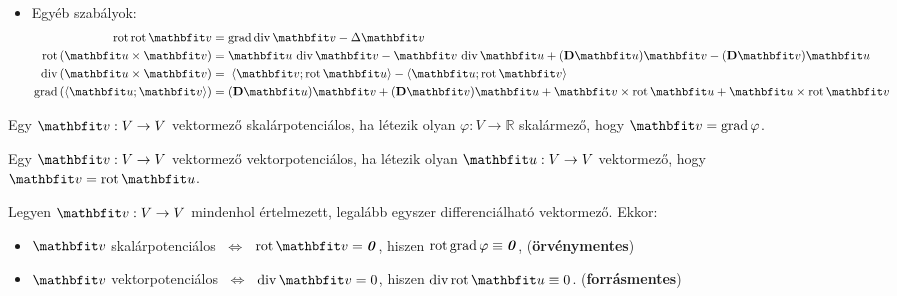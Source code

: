 \documentclass{szb-practice}
\begin{document}
\begin{blueBox}[][nobreak]
\begin{itemize}
    \item Egyéb szabályok:
          \vspace{-.5em}
          \begin{align*}
            \rot \rot \rvec v
             & =\grad \Div \rvec v
            - \Delta \rvec v
            \\
            \rot \left( \rvec u \times \rvec v \right)
             & = \rvec u \, \Div \rvec v
            - \rvec v \, \Div \rvec u
            + (\DD \rvec u) \rvec v
            - (\DD \rvec v) \rvec u
            \\
            \Div \left( \rvec u \times \rvec v \right)
             & = \; \scalar{\rvec v}{\rot \rvec u}
            - \scalar{\rvec u}{\rot \rvec v}
            \\
            \grad \left( \scalar{\rvec u}{\rvec v} \right)
             & = (\DD \rvec u) \rvec v
            + (\DD \rvec v) \rvec u
            + \rvec v \times \rot \rvec u
            + \rvec u \times \rot \rvec v
          \end{align*}
  \end{itemize}
\end{blueBox}

\clearpage
\begin{definition}[Skalárpotenciálosság]
  Egy $\rvec v: V \rightarrow V$ vektormező skalárpotenciálos, ha létezik olyan
  $\varphi: V \rightarrow \mathbb R$ skalármező, hogy $\rvec v = \grad \varphi$.
\end{definition}

\begin{definition}[Vektorpotenciálosság]
  Egy $\rvec v: V \rightarrow V$ vektormező vektorpotenciálos, ha létezik olyan
  $\rvec u: V \rightarrow V$ vektormező, hogy $\rvec v = \rot \rvec u$.
\end{definition}

\begin{theorem}
  Legyen $\rvec v: V \rightarrow V$ mindenhol értelmezett, legalább egyszer
  differenciálható vektormező. Ekkor:
  \begin{itemize}
    \item $\rvec v$ skalárpotenciálos
          $\;\Leftrightarrow\;$
          $\rot \rvec v = \nvec$,
          hiszen $\operatorname{rot} \operatorname{grad} \varphi \equiv \text{\textbf{\textit{0}}}$,
          \hfill (\textbf{örvénymentes})
    \item $\rvec v$ vektorpotenciálos
          $\;\Leftrightarrow\;$
          $\Div \rvec v = 0$,
          hiszen $\Div \rot \rvec u \equiv 0$.
          \hfill (\textbf{forrásmentes})
  \end{itemize}
\end{theorem}
\end{document}
